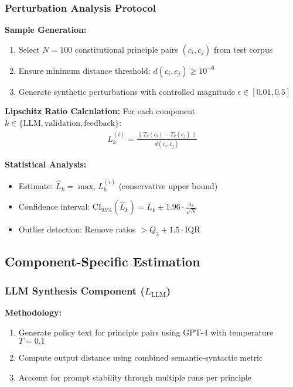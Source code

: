 \subsubsection{Perturbation Analysis Protocol}

\textbf{Sample Generation:}
\begin{enumerate}
    \item Select $N = 100$ constitutional principle pairs $(c_i, c_j)$ from test corpus
    \item Ensure minimum distance threshold: $d(c_i, c_j) \geq 10^{-6}$
    \item Generate synthetic perturbations with controlled magnitude $\epsilon \in [0.01, 0.5]$
\end{enumerate}

\textbf{Lipschitz Ratio Calculation:}
For each component $k \in \{\text{LLM}, \text{validation}, \text{feedback}\}$:
\begin{align}
L_k^{(i)} = \frac{\|T_k(c_i) - T_k(c_j)\|}{d(c_i, c_j)}
\end{align}

\textbf{Statistical Analysis:}
\begin{itemize}
    \item Estimate: $\hat{L}_k = \max_i L_k^{(i)}$ (conservative upper bound)
    \item Confidence interval: $\text{CI}_{95\%}(\hat{L}_k) = \bar{L}_k \pm 1.96 \cdot \frac{s_k}{\sqrt{N}}$
    \item Outlier detection: Remove ratios $> Q_3 + 1.5 \cdot \text{IQR}$
\end{itemize}

\subsection{Component-Specific Estimation}

\subsubsection{LLM Synthesis Component ($L_{\text{LLM}}$)}

\textbf{Methodology:}
\begin{enumerate}
    \item Generate policy text for principle pairs using GPT-4 with temperature $T = 0.1$
    \item Compute output distance using combined semantic-syntactic metric
    \item Account for prompt stability through multiple runs per principle
\end{enumerate}

